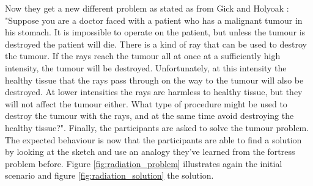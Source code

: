 \documentclass[12pt]{article}
\begin{document}
Now they get a new different problem as stated as from Gick and Holyoak \cite[307-308]{gick1980analogical}: "Suppose you are a doctor faced with a patient who has a malignant tumour in his stomach. It is impossible to operate on the patient, but unless the tumour is destroyed the patient will die. There is a kind of ray that can be used to destroy the tumour. If  the rays reach the tumour all at once at a sufficiently high intensity, the tumour will be destroyed. Unfortunately, at this intensity the healthy tissue that the rays pass through on the way to the tumour will also be destroyed. At lower intensities the rays are harmless to healthy tissue, but they will not affect the tumour either. What type of procedure might be used to destroy the tumour with the rays, and at the same time avoid destroying the healthy tissue?". Finally, the participants are asked to solve the tumour problem. The expected behaviour is now that the participants are able to find a solution by looking at the sketch and use an analogy they've learned from the fortress problem before. Figure \ref{fig:radiation_problem} illustrates again the initial scenario and figure \ref{fig:radiation_solution} the solution.
\end{document}
